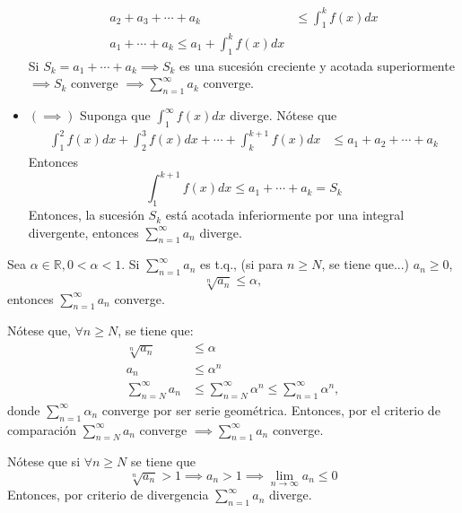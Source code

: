 \begin{teorema}
\begin{dem}
\begin{itemize}
\begin{align*}
                a_2+a_3+\cdots+a_k&\leq \int_1^k f(x)dx\\
                a_1+\cdots+a_k\leq a_1+\int_1^k f(x)dx
            \end{align*}
            Si $S_k=a_1+\cdots+a_k\implies S_k$ es una sucesión creciente y acotada superiormente $\implies S_k$ converge $\implies \sum_{n=1}^\infty a_k$ converge. 
            \item $(\implies)$ Suponga que $\int_1^{\infty} f(x)dx$ diverge. Nótese que 
            \begin{align*}
                \int_1^2 f(x)dx+\int_2^3 f(x)dx+\cdots +\int_{k}^{k+1}f(x)dx&\leq a_1+a_2+\cdots+a_k
            \end{align*}
            Entonces 
            $$\int_{1}^{k+1}f(x)dx\leq a_1+\cdots+ a_k=S_k$$
            Entonces, la sucesión $S_k$ está acotada inferiormente por una integral divergente, entonces $\sum_{n=1}^\infty a_n$ diverge. 
        \end{itemize}
    \end{dem}
\end{teorema}

\begin{prop}
    Sea $\alpha \in \mathbb{R}, 0<\alpha <1$. Si $\sum_{n=1}^\infty a_n$ es t.q., (si para $n\geq N$, se tiene que...) $a_n\geq 0$, 
    $$\sqrt[n]{a_n}\leq\alpha,$$
    entonces $\sum_{n=1}^\infty a_n$ converge. 
    \begin{dem}
        Nótese que, $\forall n\geq N$, se tiene que:
        \begin{align*}
            \sqrt[n]{a_n}&\leq \alpha\\
            a_n&\leq \alpha^n\\
            \sum_{n=N}^{\infty}a_n&\leq \sum_{n=N}^{\infty}\alpha^n\leq \sum_{n=1}^{\infty}\alpha^n,
        \end{align*}
        donde $\sum_{n=1}^\infty \alpha_n$ converge por ser serie geométrica. Entonces, por el criterio de comparación $\sum_{n=N}^{\infty}a_n$ converge $\implies \sum_{n=1}^{\infty} a_n$ converge. 
        \begin{cajita}
            \begin{nota}
                Nótese que si $\forall n\geq N$ se tiene que 
                $$\sqrt[n]{a_n}>1\implies a_n>1\implies \lim_{n\to\infty}a_n\leq 0$$
                Entonces, por criterio de divergencia $\sum_{n=1}^{\infty}a_n$ diverge.
            \end{nota}
        \end{cajita}
    \end{dem}

\end{prop}

